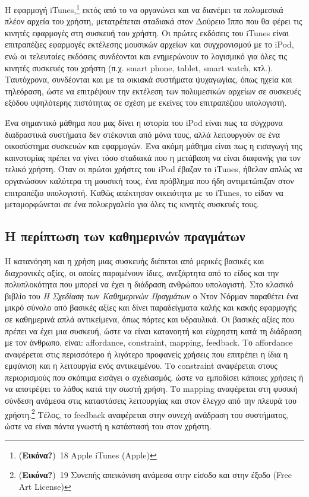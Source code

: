 \documentclass[
]{article}
\begin{document}
Η εφαρμογή iTunes,\footnote{(\textbf{Εικόνα?})~18 Apple iTunes (Apple)}
εκτός από το να οργανώνει και να διανέμει τα πολυμεσικά πλέον αρχεία του
χρήστη, μετατρέπεται σταδιακά στον Δούρειο Ίππο που θα φέρει τις κινητές
εφαρμογές στη συσκευή του χρήστη. Οι πρώτες εκδόσεις του iTunes είναι
επιτραπέζιες εφαρμογές εκτέλεσης μουσικών αρχείων και συγχρονισμού με το
iPod, ενώ οι τελευταίες εκδόσεις συνδέονται και ενημερώνουν το λογισμικό
για όλες τις κινητές συσκευές του χρήστη (π.χ. smart phone, tablet,
smart watch, κτλ.). Ταυτόχρονα, συνδέονται και με τα οικιακά συστήματα
ψυχαγωγίας, όπως ηχεία και τηλεόραση, ώστε να επιτρέψουν την εκτέλεση
των πολυμεσικών αρχείων σε συσκευές εξόδου υψηλότερης πιστότητας σε
σχέση με εκείνες του επιτραπέζιου υπολογιστή.

Ένα σημαντικό μάθημα που μας δίνει η ιστορία του iPod είναι πως τα
σύγχρονα διαδραστικά συστήματα δεν στέκονται από μόνα τους, αλλά
λειτουργούν σε ένα οικοσύστημα συσκευών και εφαρμογών. Ένα ακόμη μάθημα
είναι πως η εισαγωγή της καινοτομίας πρέπει να γίνει τόσο σταδιακά που η
μετάβαση να είναι διαφανής για τον τελικό χρήστη. Όταν οι πρώτοι χρήστες
του iPod έβαζαν το iTunes, ήθελαν απλώς να οργανώσουν καλύτερα τη
μουσική τους, ένα πρόβλημα που ήδη αντιμετώπιζαν στον επιτραπέζιο
υπολογιστή. Καθώς απέκτησαν οικειότητα με το iTunes, το είδαν να
μεταμορφώνεται σε ένα πολυεργαλείο για όλες τις κινητές συσκευές τους.

\hypertarget{ux3b7-ux3c0ux3b5ux3c1ux3afux3c0ux3c4ux3c9ux3c3ux3b7-ux3c4ux3c9ux3bd-ux3baux3b1ux3b8ux3b7ux3bcux3b5ux3c1ux3b9ux3bdux3ceux3bd-ux3c0ux3c1ux3b1ux3b3ux3bcux3acux3c4ux3c9ux3bd}{%
\subsection{Η περίπτωση των καθημερινών
πραγμάτων}\label{ux3b7-ux3c0ux3b5ux3c1ux3afux3c0ux3c4ux3c9ux3c3ux3b7-ux3c4ux3c9ux3bd-ux3baux3b1ux3b8ux3b7ux3bcux3b5ux3c1ux3b9ux3bdux3ceux3bd-ux3c0ux3c1ux3b1ux3b3ux3bcux3acux3c4ux3c9ux3bd}}

Η κατανόηση και η χρήση μιας συσκευής διέπεται από μερικές βασικές και
διαχρονικές αξίες, οι οποίες παραμένουν ίδιες, ανεξάρτητα από το είδος
και την πολυπλοκότητα που μπορεί να έχει η διάδραση ανθρώπου υπολογιστή.
Στο κλασικό βιβλίο του \emph{Η Σχεδίαση των Καθημερινών Πραγμάτων} ο
Ντον Νόρμαν παραθέτει ένα μικρό σύνολο από βασικές αξίες και δίνει
παραδείγματα καλής και κακής εφαρμογής σε καθημερινά απλά αντικείμενα,
όπως πόρτες και υδραυλικά. Οι βασικές αξίες που πρέπει να έχει μια
συσκευή, ώστε να είναι κατανοητή και εύχρηστη κατά τη διάδραση με τον
άνθρωπο, είναι: affordance, constraint, mapping, feedback. Το affordance
αναφέρεται στις περισσότερο ή λιγότερο προφανείς χρήσεις που επιτρέπει η
ίδια η εμφάνιση και η λειτουργία ενός αντικειμένου. Το constraint
αναφέρεται στους περιορισμούς που σκόπιμα εισάγει ο σχεδιασμός, ώστε να
εμποδίσει κάποιες χρήσεις ή να αποτρέψει το λάθος κατά την σωστή χρήση.
Το mapping αναφέρεται στη φυσική σύνδεση ανάμεσα στις καταστάσεις
λειτουργίας και στον έλεγχο από την πλευρά του χρήστη.\footnote{(\textbf{Εικόνα?})~19
  Συνεπής απεικόνιση ανάμεσα στην είσοδο και στην έξοδο (Free Art
  License)} Τέλος, το feedback αναφέρεται στην συνεχή ανάδραση του
συστήματος, ώστε να είναι πάντα γνωστή η κατάστασή του στον χρήστη.
\end{document}
